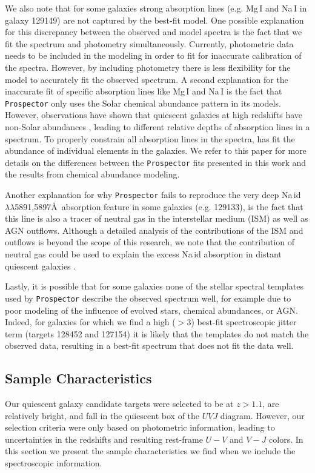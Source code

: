 \documentclass[twocolumn, astrosymb]{aastex631}
\begin{document}
We also note that for some galaxies strong absorption lines (e.g. Mg\,I and Na\,I in galaxy 129149) are not captured by the best-fit model. One possible explanation for this discrepancy between the observed and model spectra is the fact that we fit the spectrum and photometry simultaneously. Currently, photometric data needs to be included in the modeling in order to fit for inaccurate calibration of the spectra. However, by including photometry there is less flexibility for the model to accurately fit the observed spectrum. A second explanation for the inaccurate fit of specific absorption lines like Mg\,I and Na\,I is the fact that \texttt{Prospector} only uses the Solar chemical abundance pattern in its models. However, observations have shown that quiescent galaxies at high redshifts have non-Solar abundances \citep[e.g.,][]{JChoi2014, RMaiolino2019, ABeverage2024}, leading to different relative depths of absorption lines in a spectrum. To properly constrain all absorption lines in the spectra, \citet{ABeverage2024b} has fit the abundance of individual elements in the galaxies. We refer to this paper for more details on the differences between the \texttt{Prospector} fits presented in this work and the results from chemical abundance modeling.

Another explanation for why \texttt{Prospector} fails to reproduce the very deep Na\,{\sc id}$\lambda\lambda$5891,5897\AA\ absorption feature in some galaxies (e.g. 129133), is the fact that this line is also a tracer of neutral gas in the interstellar medium (ISM) as well as AGN outflows.
Although a detailed analysis of the contributions of the ISM and outflows is beyond the scope of this research, we note that the contribution of neutral gas could be used to explain the excess Na\,{\sc id} absorption in distant quiescent galaxies \citep[e.g.,][]{MJafariyazani2020, SBelli2023, RDavies2024}.

Lastly, it is possible that for some galaxies none of the stellar spectral templates used by \texttt{Prospector} describe the observed spectrum well, for example due to poor modeling of the influence of evolved stars, chemical abundances, or AGN. Indeed, for galaxies for which we find a high ($>3$) best-fit spectroscopic jitter term (targets 128452 and 127154) it is likely that the templates do not match the observed data, resulting in a best-fit spectrum that does not fit the data well.

\subsection{Sample Characteristics}\label{sec:samp_chars}
Our quiescent galaxy candidate targets were selected to be at $z>1.1$, are relatively bright, and fall in the quiescent box of the $UVJ$ diagram. However, our selection criteria were only based on photometric information, leading to uncertainties in the redshifts and resulting rest-frame $U-V$ and $V-J$ colors. In this section we present the sample characteristics we find when we include the spectroscopic information.
\end{document}
